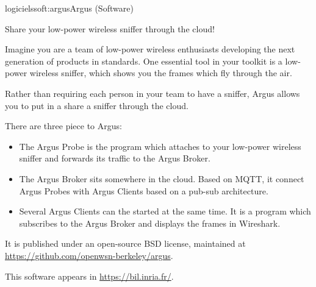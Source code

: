 \documentclass{ra2016}
\begin{document}
\begin{module}{logiciels}{soft:argus}{Argus (Software)}
\label{soft:argus}

\begin{participants}
\end{participants}

Share your low-power wireless sniffer through the cloud!

Imagine you are a team of low-power wireless enthusiasts developing the next generation of products in standards. One essential tool in your toolkit is a low-power wireless sniffer, which shows you the frames which fly through the air.

Rather than requiring each person in your team to have a sniffer, Argus allows you to put in a share a sniffer through the cloud.

There are three piece to Argus:

\begin{itemize}
    \item The Argus Probe is the program which attaches to your low-power wireless sniffer and forwards its traffic to the Argus Broker.
    \item The Argus Broker sits somewhere in the cloud. Based on MQTT, it connect Argus Probes with Argus Clients based on a pub-sub architecture.
    \item Several Argus Clients can the started at the same time. It is a program which subscribes to the Argus Broker and displays the frames in Wireshark.
\end{itemize}

It is published under an open-source BSD license, maintained at \url{https://github.com/openwsn-berkeley/argus}.

This software appears in \url{https://bil.inria.fr/}.

\end{module}
\end{document}
